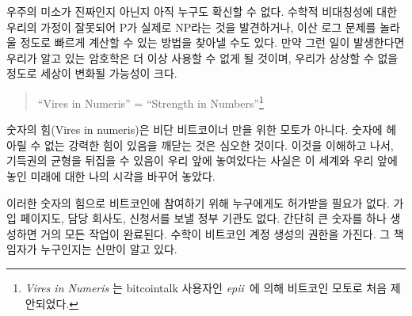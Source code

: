 \begin{comment}
	Nobody yet knows for sure if the universe's smile is genuine or not. It
	is possible that our assumption of mathematical asymmetries is wrong and
	we find that P actually equals NP \cite{wiki:pnp}, or we find surprisingly quick
	solutions to specific problems \cite{wiki:discrete-log} which we currently assume to be hard.
	If that should be the case, cryptography as we know it will cease to
	exist, and the implications would most likely change the world beyond
	recognition.
\end{comment}
우주의 미소가 진짜인지 아닌지 아직 누구도 확신할 수 없다.  
수학적 비대칭성에 대한 우리의 가정이 잘못되어 P가 실제로 NP\cite{wiki:pnp}라는 것을 발견하거나, 
이산 로그 문제\cite{wiki:discrete-log}를 놀라울 정도로 빠르게 계산할 수 있는 방법을 찾아낼 수도 있다. 
만약 그런 일이 발생한다면 우리가 알고 있는 암호학은 더 이상 사용할 수 없게 될 것이며, 
우리가 상상할 수 없을 정도로 세상이 변화될 가능성이 크다. 

\begin{quotation}\begin{samepage}
		\enquote{Vires in Numeris} = \enquote{Strength in Numbers}\footnote{\textit{Vires in Numeris} 는 bitcointalk 사용자인 \textit{epii}~\cite{epii}에 의해 
			비트코인 모토로 처음 제안되었다.}
\end{samepage}\end{quotation}

\begin{comment}
	\textit{Vires in numeris} is not only a catchy motto used by bitcoiners. The
	realization that there is an unfathomable strength to be found in
	numbers is a profound one. Understanding this, and the inversion of
	existing power balances which it enables changed my view of the world
	and the future which lies ahead of us.
\end{comment}
숫자의 힘(Vires in numeris)은 비단 비트코이너 만을 위한 모토가 아니다.
숫자에 헤아릴 수 없는 강력한 힘이 있음을 깨닫는 것은 심오한 것이다.
이것을 이해하고 나서, 기득권의 균형을 뒤집을 수 있음이 우리 앞에 놓여있다는 사실은
이 세계와 우리 앞에 놓인 미래에 대한 나의 시각을 바꾸어 놓았다.

\begin{comment}
	One direct result of this is the fact that you don't have to ask anyone for permission to participate in Bitcoin. 
	There is no page to sign up, no company in charge, no government agency to send application forms to.
	Simply generate a large number and you are pretty much good to go. 
	The central authority of account creation is mathematics. And God only knows who is in charge of that.
\end{comment}
이러한 숫자의 힘으로 비트코인에 참여하기 위해 누구에게도 허가받을 필요가 없다.
가입 페이지도, 담당 회사도, 신청서를 보낼 정부 기관도 없다.
간단히 큰 숫자를 하나 생성하면 거의 모든 작업이 완료된다. 
수학이 비트코인 계정 생성의 권한을 가진다. 그 책임자가 누구인지는 신만이 알고 있다.

